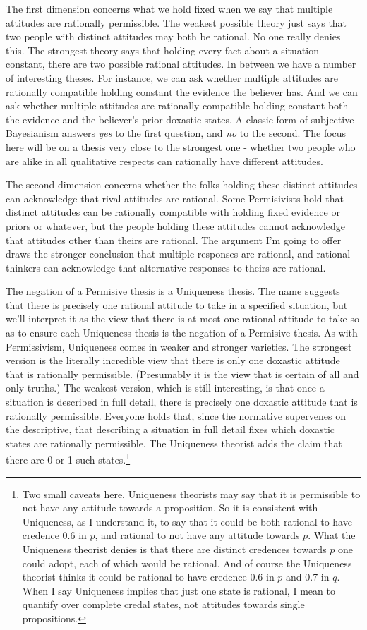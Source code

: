 \documentclass[
  11pt,
]{article}
\begin{document}
The first dimension concerns what we hold fixed when we say that multiple attitudes are rationally permissible. The weakest possible theory just says that two people with distinct attitudes may both be rational. No one really denies this. The strongest theory says that holding every fact about a situation constant, there are two possible rational attitudes. In between we have a number of interesting theses. For instance, we can ask whether multiple attitudes are rationally compatible holding constant the evidence the believer has. And we can ask whether multiple attitudes are rationally compatible holding constant both the evidence and the believer's prior doxastic states. A classic form of subjective Bayesianism answers \emph{yes} to the first question, and \emph{no} to the second. The focus here will be on a thesis very close to the strongest one - whether two people who are alike in all qualitative respects can rationally have different attitudes.

The second dimension concerns whether the folks holding these distinct attitudes can acknowledge that rival attitudes are rational. Some Permisivists hold that distinct attitudes can be rationally compatible with holding fixed evidence or priors or whatever, but the people holding these attitudes cannot acknowledge that attitudes other than theirs are rational. The argument I'm going to offer draws the stronger conclusion that multiple responses are rational, and rational thinkers can acknowledge that alternative responses to theirs are rational.

The negation of a Permisive thesis is a Uniqueness thesis. The name suggests that there is precisely one rational attitude to take in a specified situation, but we'll interpret it as the view that there is at most one rational attitude to take so as to ensure each Uniqueness thesis is the negation of a Permisive thesis. As with Permissivism, Uniqueness comes in weaker and stronger varieties. The strongest version is the literally incredible view that there is only one doxastic attitude that is rationally permissible. (Presumably it is the view that is certain of all and only truths.) The weakest version, which is still interesting, is that once a situation is described in full detail, there is precisely one doxastic attitude that is rationally permissible. Everyone holds that, since the normative supervenes on the descriptive, that describing a situation in full detail fixes which doxastic states are rationally permissible. The Uniqueness theorist adds the claim that there are 0 or 1 such states.\footnote{Two small caveats here. Uniqueness theorists may say that it is permissible to not have any attitude towards a proposition. So it is consistent with Uniqueness, as I understand it, to say that it could be both rational to have credence 0.6 in \(p\), and rational to not have any attitude towards \(p\). What the Uniqueness theorist denies is that there are distinct credences towards \(p\) one could adopt, each of which would be rational. And of course the Uniqueness theorist thinks it could be rational to have credence 0.6 in \(p\) and 0.7 in \(q\). When I say Uniqueness implies that just one state is rational, I mean to quantify over complete credal states, not attitudes towards single propositions.}
\end{document}
